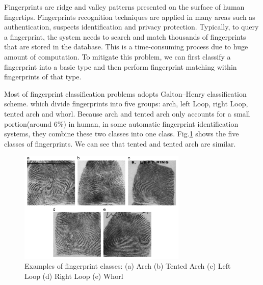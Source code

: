 

Fingerprints are ridge and valley patterns presented on the surface of human fingertips.
%
Fingerprints recognition techniques are applied in many areas such as authentication, suspects identification and privacy protection.
%
Typically, to query a fingerprint, the system needs to search and match thousands of fingerprints that are stored in the database. This is a time-consuming process due to huge amount of computation.
%
To mitigate this problem, we can first classify a fingerprint into a basic type and then perform fingerprint matching within fingerprints of that type.
%

%
Most of fingerprint classification problems adopts Galton–Henry classification scheme.\cite{henry1905classification} which divide fingerprints into five groups: arch, left Loop, right Loop, tented arch and whorl. 
%
Because arch and tented arch only accounts for a small portion(around 6\%) in human, in some automatic fingerprint identification systems, they combine these two classes into one class. 
%
Fig.\ref{fig.fingerprint_classes} shows the five classes of fingerprints. We can see that tented and tented arch are similar.

\begin{figure}[!ht]
	\begin{center}
		\includegraphics[width=8cm]{fig/Fingerprint_classes.png}
	\end{center}
	\caption{Examples of fingerprint classes: (a) Arch (b) Tented Arch (c) Left Loop (d) Right Loop  (e) Whorl \cite{cao2013fingerprint}} 
	\label{fig.fingerprint_classes}
\end{figure}

